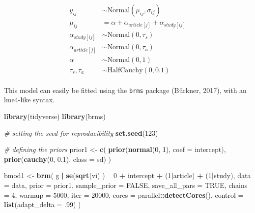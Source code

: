 \documentclass[floatsintext,doc]{apa6}
\newenvironment{Shaded}{\begin{snugshade}}{\end{snugshade}}
\newcommand{\CommentTok}[1]{\textcolor[rgb]{0.56,0.35,0.01}{\textit{#1}}}
\newcommand{\DataTypeTok}[1]{\textcolor[rgb]{0.13,0.29,0.53}{#1}}
\newcommand{\DecValTok}[1]{\textcolor[rgb]{0.00,0.00,0.81}{#1}}
\newcommand{\FloatTok}[1]{\textcolor[rgb]{0.00,0.00,0.81}{#1}}
\newcommand{\KeywordTok}[1]{\textcolor[rgb]{0.13,0.29,0.53}{\textbf{#1}}}
\newcommand{\NormalTok}[1]{#1}
\newcommand{\OperatorTok}[1]{\textcolor[rgb]{0.81,0.36,0.00}{\textbf{#1}}}
\newcommand{\OtherTok}[1]{\textcolor[rgb]{0.56,0.35,0.01}{#1}}
\newcommand{\StringTok}[1]{\textcolor[rgb]{0.31,0.60,0.02}{#1}}
\begin{document}
\[
\begin{aligned}
y_{ij} &\sim \mathrm{Normal}(\mu_{ij}, \sigma_{ij}) \\
\mu_{ij} &= \alpha + \alpha_{article[j]} + \alpha_{study[ij]} \\
\alpha_{study[ij]} &\sim \mathrm{Normal}(0, \tau_{s}) \\
\alpha_{article[j]} &\sim \mathrm{Normal}(0, \tau_{a}) \\
\alpha &\sim \mathrm{Normal}(0, 1) \\
\tau_{s}, \tau_{a} &\sim \mathrm{HalfCauchy}(0, 0.1) \\
\end{aligned}
\]

This model can easily be fitted using the \texttt{brms} package (Bürkner, 2017), with an lme4-like syntax.

\begin{Shaded}
\begin{Highlighting}[]
\KeywordTok{library}\NormalTok{(tidyverse)}
\KeywordTok{library}\NormalTok{(brms)}

\CommentTok{# setting the seed for reproducibility}
\KeywordTok{set.seed}\NormalTok{(}\DecValTok{123}\NormalTok{)}

\CommentTok{# defining the priors}
\NormalTok{prior1 <-}\StringTok{ }\KeywordTok{c}\NormalTok{(}
    \KeywordTok{prior}\NormalTok{(}\KeywordTok{normal}\NormalTok{(}\DecValTok{0}\NormalTok{, }\DecValTok{1}\NormalTok{), }\DataTypeTok{coef =}\NormalTok{ intercept),}
    \KeywordTok{prior}\NormalTok{(}\KeywordTok{cauchy}\NormalTok{(}\DecValTok{0}\NormalTok{, }\FloatTok{0.1}\NormalTok{), }\DataTypeTok{class =}\NormalTok{ sd)}
\NormalTok{    )}

\NormalTok{bmod1 <-}\StringTok{ }\KeywordTok{brm}\NormalTok{(}
\NormalTok{    g }\OperatorTok{|}\StringTok{ }\KeywordTok{se}\NormalTok{(}\KeywordTok{sqrt}\NormalTok{(vi) ) }\OperatorTok{~}\StringTok{ }\DecValTok{0} \OperatorTok{+}\StringTok{ }\NormalTok{intercept }\OperatorTok{+}\StringTok{ }\NormalTok{(}\DecValTok{1}\OperatorTok{|}\NormalTok{article) }\OperatorTok{+}\StringTok{ }\NormalTok{(}\DecValTok{1}\OperatorTok{|}\NormalTok{study),}
    \DataTypeTok{data =}\NormalTok{ data,}
    \DataTypeTok{prior =}\NormalTok{ prior1,}
    \DataTypeTok{sample_prior =} \OtherTok{FALSE}\NormalTok{,}
    \DataTypeTok{save_all_pars =} \OtherTok{TRUE}\NormalTok{,}
    \DataTypeTok{chains =} \DecValTok{4}\NormalTok{,}
    \DataTypeTok{warmup =} \DecValTok{5000}\NormalTok{,}
    \DataTypeTok{iter =} \DecValTok{20000}\NormalTok{,}
    \DataTypeTok{cores =}\NormalTok{ parallel}\OperatorTok{::}\KeywordTok{detectCores}\NormalTok{(),}
    \DataTypeTok{control =} \KeywordTok{list}\NormalTok{(}\DataTypeTok{adapt_delta =} \FloatTok{.99}\NormalTok{)}
\NormalTok{    )}
\end{Highlighting}
\end{Shaded}
\end{document}
